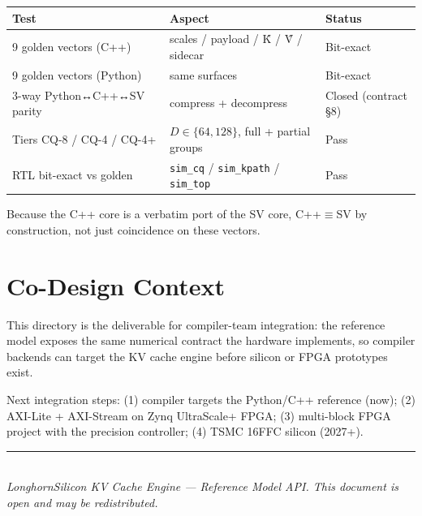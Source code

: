 \documentclass[11pt]{article}
\begin{document}
\begin{table}[h]
\centering
\small
\begin{tabular}{@{}l l l@{}}
\toprule
Test & Aspect & Status \\
\midrule
9 golden vectors (C++) & scales / payload / K̂ / V̂ / sidecar & Bit-exact \\
9 golden vectors (Python) & same surfaces & Bit-exact \\
3-way Python↔C++↔SV parity & compress + decompress & Closed (contract \S8) \\
Tiers CQ-8 / CQ-4 / CQ-4+ & $D\in\{64,128\}$, full + partial groups & Pass \\
RTL bit-exact vs golden & \texttt{sim\_cq} / \texttt{sim\_kpath} / \texttt{sim\_top} & Pass \\
\bottomrule
\end{tabular}
\end{table}

\noindent Because the C++ core is a verbatim port of the SV core, C++$\equiv$SV by
construction, not just coincidence on these vectors.

\section{Co-Design Context}
\label{sec:codesign}

This directory is the deliverable for compiler-team integration: the reference
model exposes the same numerical contract the hardware implements, so compiler
backends can target the KV cache engine before silicon or FPGA prototypes exist.

\medskip
\noindent Next integration steps: (1) compiler targets the Python/C++ reference
(now); (2) AXI-Lite + AXI-Stream on Zynq UltraScale+ FPGA; (3) multi-block FPGA
project with the precision controller; (4) TSMC 16FFC silicon (2027+).

\vspace{0.5in}
\noindent\rule{\textwidth}{0.4pt}\\
\noindent\small\textit{LonghornSilicon KV Cache Engine --- Reference Model API.
This document is open and may be redistributed.}
\end{document}
